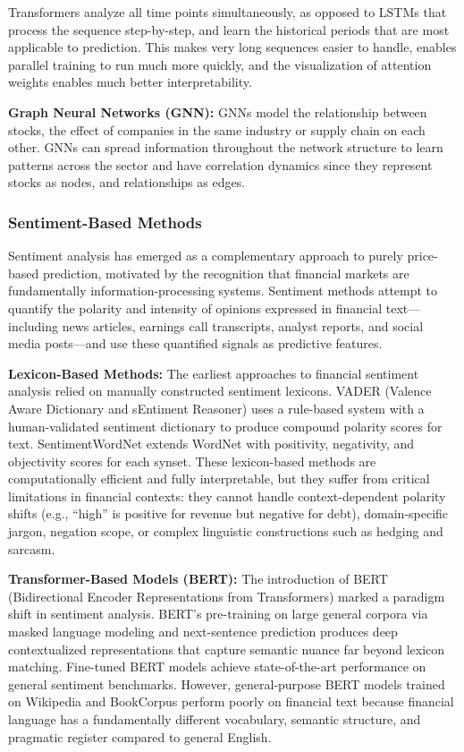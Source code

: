 Transformers analyze all time points simultaneously, as opposed to LSTMs that process the sequence step-by-step, and learn the historical periods that are most applicable to prediction. This makes very long sequences easier to handle, enables parallel training to run much more quickly, and the visualization of attention weights enables much better interpretability.


\textbf{Graph Neural Networks (GNN):}
GNNs model the relationship between stocks, the effect of companies in the same industry or supply chain on each other. GNNs can spread information throughout the network structure to learn patterns across the sector and have correlation dynamics since they represent stocks as nodes, and relationships as edges.

\subsubsection{Sentiment-Based Methods}

Sentiment analysis has emerged as a complementary approach to purely price-based prediction, motivated by the recognition that financial markets are fundamentally information-processing systems. Sentiment methods attempt to quantify the polarity and intensity of opinions expressed in financial text---including news articles, earnings call transcripts, analyst reports, and social media posts---and use these quantified signals as predictive features.

\textbf{Lexicon-Based Methods:}
The earliest approaches to financial sentiment analysis relied on manually constructed sentiment lexicons. VADER (Valence Aware Dictionary and sEntiment Reasoner) \cite{vader2014} uses a rule-based system with a human-validated sentiment dictionary to produce compound polarity scores for text. SentimentWordNet extends WordNet with positivity, negativity, and objectivity scores for each synset. These lexicon-based methods are computationally efficient and fully interpretable, but they suffer from critical limitations in financial contexts: they cannot handle context-dependent polarity shifts (e.g., ``high'' is positive for revenue but negative for debt), domain-specific jargon, negation scope, or complex linguistic constructions such as hedging and sarcasm.

\textbf{Transformer-Based Models (BERT):}
The introduction of BERT (Bidirectional Encoder Representations from Transformers) \cite{devlin2019} marked a paradigm shift in sentiment analysis. BERT's pre-training on large general corpora via masked language modeling and next-sentence prediction produces deep contextualized representations that capture semantic nuance far beyond lexicon matching. Fine-tuned BERT models achieve state-of-the-art performance on general sentiment benchmarks. However, general-purpose BERT models trained on Wikipedia and BookCorpus perform poorly on financial text because financial language has a fundamentally different vocabulary, semantic structure, and pragmatic register compared to general English.

